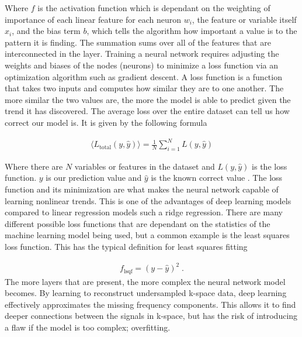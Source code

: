 \documentclass[14pt]{extreport}
\begin{document}
        Where $f$ is the activation function which is dependant on the weighting of importance of each linear feature for each neuron $w_i$, the feature or variable itself $x_i$, and the bias term $b$, which tells the algorithm how important a value is to the pattern it is finding. The summation sums over all of the features that are interconnected in the layer. Training a neural network requires adjusting the weights and biases of the nodes (neurons) to minimize a loss function via an optimization algorithm such as gradient descent. A loss function is a function that takes two inputs and computes how similar they are to one another. The more similar the two values are, the more the model is able to predict given the trend it has discovered. The average loss over the entire dataset can tell us how correct our model is. It is given by the following formula
        
        \begin{align}
            \langle L_{\text{total}}(y, \hat{y}) \rangle = \frac{1}{N} \sum_{i = 1}^N L(y, \hat{y})
        \end{align}

        Where there are $N$ variables or features in the dataset and $L(y, \hat{y})$ is the loss function. $y$ is our prediction value and $\hat{y}$ is the known correct value \cite{Hoyle_2024}. The loss function and its minimization are what makes the neural network capable of learning nonlinear trends. This is one of the advantages of deep learning models compared to linear regression models such a ridge regression. There are many different possible loss functions that are dependant on the statistics of the machine learning model being used, but a common example is the least squares loss function. This has the typical definition for least squares fitting \cite{Hoyle_2024}
        
        \begin{align}
            f_{\text{lsqf}} = \left(y - \hat{y} \right)^2\;.
        \end{align}
        The more layers that are present, the more complex the neural network model becomes. By learning to reconstruct undersampled k-space data, deep learning effectively approximates the missing frequency components. This allows it to find deeper connections between the signals in k-space, but has the risk of introducing a flaw if the model is too complex; overfitting. 
\end{document}
